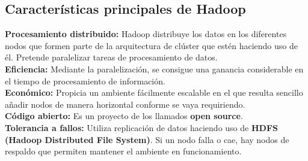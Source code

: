 \subsection{Características principales de Hadoop}

\begin{UClist}
	\UCli \textbf{Procesamiento distribuido:} Hadoop distribuye los datos en los diferentes nodos que formen parte de la arquitectura de clúster que estén haciendo uso de él. Pretende paralelizar tareas de procesamiento de datos\cite{hadoop}.\\
	\UCli \textbf{Eficiencia:} Mediante la paralelización, se consigue una ganancia considerable en el tiempo de procesamiento de información.\cite{hadoop}\\
	\UCli \textbf{Económico:} Propicia un ambiente fácilmente escalable en el que resulta sencillo añadir nodos de manera horizontal conforme se vaya requiriendo.\cite{hadoop}\\
	\UCli \textbf{Código abierto:} Es un proyecto de los llamados \textbf{open source}.\cite{hadoop}\\
	\UCli \textbf{Tolerancia a fallos:} Utiliza replicación de datos haciendo uso de \textbf{HDFS (Hadoop Distributed File System)}. Si un nodo falla o cae, hay nodos de respaldo que permiten mantener el ambiente en funcionamiento.\cite{hadoop}\\
\end{UClist}

\newpage
